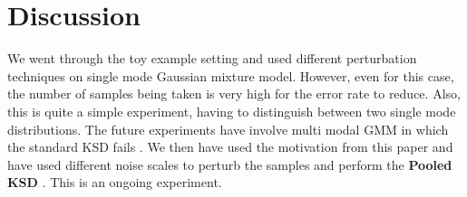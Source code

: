 \documentclass[12pt,a4paper]{report}
\begin{document}
\begin{table}[H]
    \centering

    \caption{Error rate for different sample sizes and values of $\sigma$.}
    \label{tab:error_delta_sigma}
\end{table}

\section{Discussion}
We went through the toy example setting and used different perturbation techniques on single mode Gaussian mixture model. However, even for this case, the number of samples being taken is very high for the error rate to reduce. Also, this is quite a simple experiment, having to distinguish between two single mode distributions. The future experiments have involve multi modal GMM in which the standard KSD fails \cite{liu2023usingperturbationimprovegoodnessoffit}. We then have used the motivation from this paper and have used different noise scales to perturb the samples and perform the \textbf{Pooled KSD} . This is an ongoing experiment.
\end{document}
